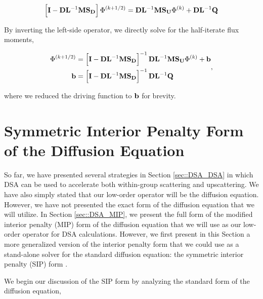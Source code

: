 \begin{equation}
\label{eq::DSA_TG_half_it}
\left[ {\bf I} - {\bf D}{\bf L}^{-1} {\bf M} {\bf S_D} \right]\Phi^{(k+1/2)} = {\bf D}{\bf L}^{-1}  {\bf M} {\bf S_U} \Phi^{(k)} + {\bf D}{\bf L}^{-1}  {\bf Q}
\end{equation}

\noindent By inverting the left-side operator, we directly solve for the half-iterate flux moments,

\begin{equation}
\label{eq::DSA_TG_half_it_sol}
\begin{aligned}
\Phi^{(k+1/2)} &= \left[ {\bf I} - {\bf D}{\bf L}^{-1} {\bf M} {\bf S_D} \right]^{-1} {\bf D}{\bf L}^{-1}  {\bf M} {\bf S_U} \Phi^{(k)} + {\bf b}  \\
{\bf b} &= \left[ {\bf I} - {\bf D}{\bf L}^{-1} {\bf M} {\bf S_D} \right]^{-1} {\bf D}{\bf L}^{-1}  {\bf Q}
\end{aligned} ,
\end{equation}

\noindent where we reduced the driving function to ${\bf b}$ for brevity.

\section{Symmetric Interior Penalty Form of the Diffusion Equation}
\label{sec::DSA_SIP}

So far, we have presented several strategies in Section \ref{sec::DSA_DSA} in which DSA can be used to accelerate both within-group scattering and upscattering. We have also simply stated that our low-order operator will be the diffusion equation. However, we have not presented the exact form of the diffusion equation that we will utilize. In Section \ref{sec::DSA_MIP}, we present the full form of the modified interior penalty (MIP) form of the diffusion equation that we will use as our low-order operator for DSA calculations. However, we first present in this Section a more generalized version of the interior penalty form that we could use as a stand-alone solver for the standard diffusion equation: the symmetric interior penalty (SIP) form \cite{arnold2002unified,ragusa2015discontinuous,ref::SIP_3D}.

We begin our discussion of the SIP form by analyzing the standard form of the diffusion equation,

